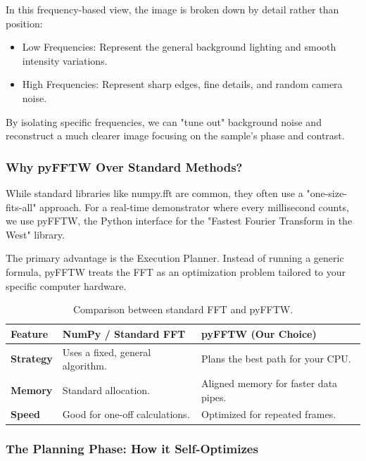 \documentclass[12pt,a4paper]{article}
\begin{document}
In this frequency-based view, the image is broken down by detail rather than position:
\begin{itemize}
    \item Low Frequencies: Represent the general background lighting and smooth intensity variations.
    \item High Frequencies: Represent sharp edges, fine details, and random camera noise.
\end{itemize}

By isolating specific frequencies, we can "tune out" background noise and reconstruct a much clearer image focusing on the sample's phase and contrast.

\subsubsection*{Why pyFFTW Over Standard Methods?}

While standard libraries like numpy.fft are common, they often use a "one-size-fits-all" approach. For a real-time demonstrator where every millisecond counts, we use pyFFTW, the Python interface for the "Fastest Fourier Transform in the West" library. 

The primary advantage is the Execution Planner. Instead of running a generic formula, pyFFTW treats the \ac{FFT} as an optimization problem tailored to your specific computer hardware.

\begin{table}[h!]
\centering
\begin{tabular}{|l|l|l|}
\hline
\textbf{Feature} & \textbf{NumPy / Standard \ac{FFT}} & \textbf{pyFFTW (Our Choice)} \\ \hline
\textbf{Strategy} & Uses a fixed, general algorithm. & Plans the best path for your CPU. \\ \hline
\textbf{Memory} & Standard allocation. & Aligned memory for faster data pipes. \\ \hline
\textbf{Speed} & Good for one-off calculations. & Optimized for repeated frames. \\ \hline
\end{tabular}
\caption{Comparison between standard \ac{FFT} and pyFFTW.}
\end{table}

\subsubsection*{The Planning Phase: How it Self-Optimizes}
\end{document}
